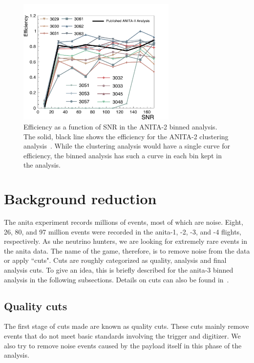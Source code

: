 \begin{figure}
\centering
\includegraphics[width=0.7\textwidth]{figures/efficiencyA2_2.pdf}
\caption{Efficiency as a function of SNR in the ANITA-2 binned analysis. The solid, black line shows the efficiency for the ANITA-2 clustering analysis~\cite{anita2}. While the clustering analysis would have a single curve for efficiency, the binned analysis has such a curve in each bin kept in the analysis.}
\label{a2_efficiency}
\end{figure}

\section{Background reduction}
\label{background}

The \gls{anita} experiment records millions of events, most of which are noise. Eight, 26, 80, and 97 million events were recorded in the \gls{anita}-1, -2, -3, and -4 flights, respectively. 
As \gls{uhe} neutrino hunters, we are looking for extremely rare events in the \gls{anita} data. The name of the game, therefore, is to remove noise from the data or apply ``cuts". Cuts are roughly categorized as quality, analysis and final analysis cuts.
To give an idea, this is briefly described for the \gls{anita}-3 binned analysis in the following subsections. Details on cuts can also be found in~\cite{brianDaileyThesis,samStaffordThesis,jacobGordonThesis}. 


\subsection{Quality cuts}
\label{qcuts}

The first stage of cuts made are known as quality cuts.
These cuts mainly remove events that do not meet basic standards involving the trigger and digitizer. We also try to remove noise events caused by the payload itself in this phase of the analysis.  
